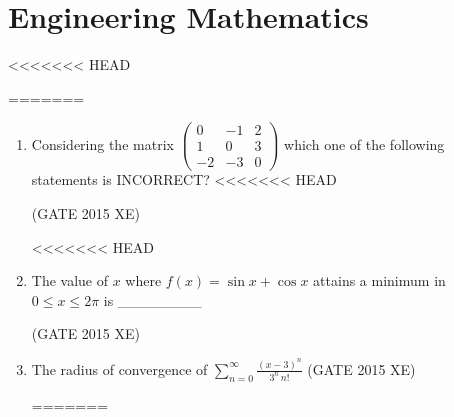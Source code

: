 \documentclass[journal,12pt,onecolumn]{IEEEtran}
\newcommand{\myvec}[1]{\begin{pmatrix}#1\end{pmatrix}}
\begin{document}

\newpage
\section*{Engineering Mathematics}
<<<<<<< HEAD
\bigskip

\begin{enumerate}
=======
\vspace{1cm}

\begin{enumerate}[label=\arabic*)]
>>>>>>> d734831 (Assignment)

\item Considering the matrix
$\myvec{ 0 & -1 & 2 \\ 1 & 0 & 3 \\ -2 & -3 & 0}$
which one of the following statements is INCORRECT?
<<<<<<< HEAD

\hfill{(GATE 2015 XE)} \\
\begin{multicols}{2}
<<<<<<< HEAD
\end{multicols}



\item The value of $x$ where $f(x) = \sin{x} + \cos{x}$ attains a minimum in $0 \le x \le 2\pi$ is \_\_\_\_\_\_\_\_

\hfill{(GATE 2015 XE)} \\

\item The radius of convergence of $\sum_{n=0}^\infty \frac{(x-3)^n}{3^n\,n!}$  
\hfill{(GATE 2015 XE)} \\

\begin{multicols}{4}
\begin{enumerate}
=======


\end{enumerate}
\end{multicols}
\end{enumerate}
\end{enumerate}
\end{document}
